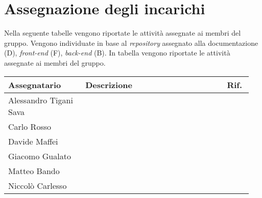\section{Assegnazione degli incarichi}
Nella seguente tabelle vengono riportate le attività assegnate ai membri del 
gruppo. Vengono individuate in base al \textit{repository} assegnato alla 
documentazione (D), \textit{front-end} (F), \textit{back-end} (B).
In tabella vengono riportate le attività assegnate ai membri del gruppo.
\begin{center}
	{
		\renewcommand{\arraystretch}{1.5}
		\begin{tabular}{p{0.30\linewidth}|p{0.55\linewidth}|p{0.10\linewidth}}
			\textbf{Assegnatario}        & \textbf{Descrizione} & \textbf{Rif.} \\

			\hline
			Alessandro Tigani Sava       &                      &               \\
			\hline
			\multirow{2}{*}{Carlo Rosso} &                      &               \\
			\cline{2-3}
			                             &                      &               \\
			\hline
			Davide Maffei                &                      &               \\
			\hline
			Giacomo Gualato & & \\
			\hline
			Matteo Bando                 &                      &               \\
			\hline
			Niccolò Carlesso             &                      &               \\
			\hline
		\end{tabular}
	}
\end{center}
